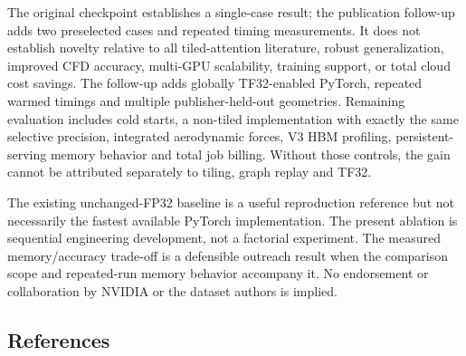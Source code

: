 \documentclass[
  10pt,
]{article}
\begin{document}
The original checkpoint establishes a single-case result; the
publication follow-up adds two preselected cases and repeated timing
measurements. It does not establish novelty relative to all
tiled-attention literature, robust generalization, improved CFD
accuracy, multi-GPU scalability, training support, or total cloud cost
savings. The follow-up adds globally TF32-enabled PyTorch, repeated
warmed timings and multiple publisher-held-out geometries. Remaining
evaluation includes cold starts, a non-tiled implementation with exactly
the same selective precision, integrated aerodynamic forces, V3 HBM
profiling, persistent-serving memory behavior and total job billing.
Without those controls, the gain cannot be attributed separately to
tiling, graph replay and TF32.

The existing unchanged-FP32 baseline is a useful reproduction reference
but not necessarily the fastest available PyTorch implementation. The
present ablation is sequential engineering development, not a factorial
experiment. The measured memory/accuracy trade-off is a defensible
outreach result when the comparison scope and repeated-run memory
behavior accompany it. No endorsement or collaboration by NVIDIA or the
dataset authors is implied.

\subsection{References}\label{references}
\end{document}
